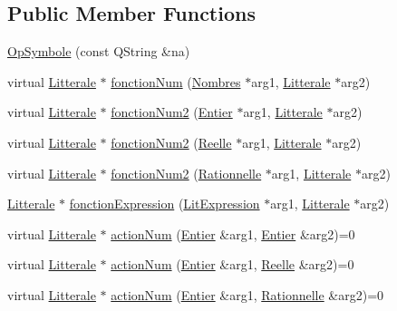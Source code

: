 \subsection*{Public Member Functions}
\begin{DoxyCompactItemize}
\item 
\hyperlink{class_op_symbole_a6de848a746e81ea134b4c28999b7179f}{Op\+Symbole} (const Q\+String \&na)
\item 
virtual \hyperlink{class_litterale}{Litterale} $\ast$ \hyperlink{class_op_symbole_ae908fd3da24f9cc8aa93f87360e07009}{fonction\+Num} (\hyperlink{class_nombres}{Nombres} $\ast$arg1, \hyperlink{class_litterale}{Litterale} $\ast$arg2)
\item 
virtual \hyperlink{class_litterale}{Litterale} $\ast$ \hyperlink{class_op_symbole_a69e1f5709d9ffba309d094856252eca7}{fonction\+Num2} (\hyperlink{class_entier}{Entier} $\ast$arg1, \hyperlink{class_litterale}{Litterale} $\ast$arg2)
\item 
virtual \hyperlink{class_litterale}{Litterale} $\ast$ \hyperlink{class_op_symbole_adacb4ef49ad6f19403a12b91ecb0c0f1}{fonction\+Num2} (\hyperlink{class_reelle}{Reelle} $\ast$arg1, \hyperlink{class_litterale}{Litterale} $\ast$arg2)
\item 
virtual \hyperlink{class_litterale}{Litterale} $\ast$ \hyperlink{class_op_symbole_a20ab54596cc3f3c8cdd059e13dc51541}{fonction\+Num2} (\hyperlink{class_rationnelle}{Rationnelle} $\ast$arg1, \hyperlink{class_litterale}{Litterale} $\ast$arg2)
\item 
\hyperlink{class_litterale}{Litterale} $\ast$ \hyperlink{class_op_symbole_a0b9eb81e1a88d0d1470f642c7afa2b8c}{fonction\+Expression} (\hyperlink{class_lit_expression}{Lit\+Expression} $\ast$arg1, \hyperlink{class_litterale}{Litterale} $\ast$arg2)
\item 
virtual \hyperlink{class_litterale}{Litterale} $\ast$ \hyperlink{class_op_symbole_a58c6b09cf3ccc1d753f6c5702eb3dfdd}{action\+Num} (\hyperlink{class_entier}{Entier} \&arg1, \hyperlink{class_entier}{Entier} \&arg2)=0
\item 
virtual \hyperlink{class_litterale}{Litterale} $\ast$ \hyperlink{class_op_symbole_a99b426017e9db00066ca7f960b7ab5aa}{action\+Num} (\hyperlink{class_entier}{Entier} \&arg1, \hyperlink{class_reelle}{Reelle} \&arg2)=0
\item 
virtual \hyperlink{class_litterale}{Litterale} $\ast$ \hyperlink{class_op_symbole_ae13989c55c53a7ec7c79d371ee05fbaa}{action\+Num} (\hyperlink{class_entier}{Entier} \&arg1, \hyperlink{class_rationnelle}{Rationnelle} \&arg2)=0

\end{DoxyCompactItemize}
